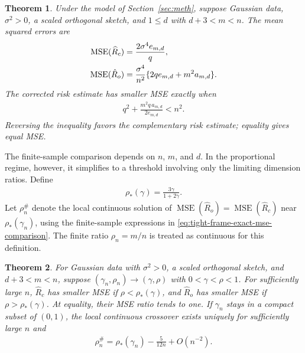 \documentclass{article}
\theoremstyle{plain} %
\newtheorem{theorem}{Theorem}[section]
\theoremstyle{definition} %
\theoremstyle{definition} %
\newcommand{\hR}{\hat{R}}
\begin{document}
\begin{theorem}
\label{thm:tight-frame-mse-comparison}
Under the model of Section~\ref{sec:meth}, suppose Gaussian data,
$\sigma^2>0$, a scaled orthogonal sketch, and $1\leq d$ with $d+3<m<n$.
The mean squared errors are
\begin{align}
   \operatorname{MSE}(\widehat R_c)
   &=\frac{2\sigma^4e_{m,d}}q, \notag\\
   \operatorname{MSE}(\hR_o)&=
   \frac{\sigma^4}{n^2}\{2qe_{m,d}+m^2a_{m,d}\}.
   \label{eq:tight-frame-exact-mse-comparison}
\end{align}
The corrected risk estimate has smaller MSE exactly when
\begin{align}
   q^2+\frac{m^2q\,a_{m,d}}{2e_{m,d}}<n^2.
   \label{eq:tight-frame-finite-mse-rule}
\end{align}
Reversing the inequality favors the complementary risk estimate; equality
gives equal MSE.
\end{theorem}

The finite-sample comparison depends on $n$, $m$, and $d$. In the proportional regime, however, it simplifies to a threshold involving only the limiting dimension ratios. Define
\begin{align*}
 \rho_*(\gamma)=\frac{3\gamma}{1+2\gamma}.
\end{align*}
Let $\rho_n^{\#}$ denote the local continuous solution of
$\operatorname{MSE}(\hR_o)=\operatorname{MSE}(\widehat R_c)$ near
$\rho_*(\gamma_n)$, using the finite-sample expressions in
\eqref{eq:tight-frame-exact-mse-comparison}.
The finite ratio $\rho_n=m/n$ is treated as continuous for this definition.

\begin{theorem}
\label{thm:cpal-mse-comparison}
\label{thm:tight-frame-asymptotic-mse-threshold}
For Gaussian data with $\sigma^2>0$, a scaled orthogonal sketch, and
$d+3<m<n$, suppose $(\gamma_n,\rho_n)\to(\gamma,\rho)$ with
$0<\gamma<\rho<1$.
For sufficiently large $n$, $\widehat R_c$ has smaller MSE if
$\rho<\rho_*(\gamma)$, and $\hR_o$ has smaller MSE if
$\rho>\rho_*(\gamma)$. At equality, their MSE ratio tends to one.
If $\gamma_n$ stays in a compact subset of $(0,1)$, the local
continuous crossover exists uniquely for sufficiently large $n$ and
\begin{align}
 \rho_n^{\#}
 =\rho_*(\gamma_n)-\frac{5}{12n}+O(n^{-2}).
 \label{eq:cpal-finite-mse-threshold}
\end{align}
\end{theorem}
\end{document}
